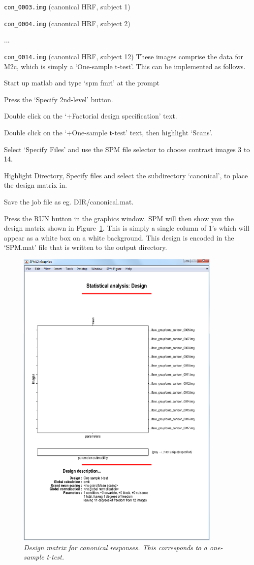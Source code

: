\bi
\item{\verb!con_0003.img!		(canonical HRF, subject 1)}
\item{\verb!con_0004.img!		(canonical HRF, subject 2)}
\item{...}
\item{\verb!con_0014.img!		(canonical HRF, subject 12)}
\ei
These images comprise the data for M2c, which is simply a `One-sample t-test'. This can be implemented as follows.
\bi
\item{Start up matlab and type `spm fmri' at the prompt}
\item{Press the `Specify 2nd-level' button.}
\item{Double click on the `+Factorial design specification' text.}
\item{Double click on the `+One-sample t-test' text, then highlight `Scans'.} 
\item{Select `Specify Files' and use the SPM file selector
to choose contrast images 3 to 14.}
\item{Highlight Directory, Specify files and select the 
subdirectory `canonical', to place the design matrix in.}
\item{Save the job file as eg. {\sf DIR/canonical.mat}}.
\item{Press the RUN button in the graphics window.}
\ei
SPM will then show you the design matrix shown in Figure~\ref{t1}. This is simply a single column of 1's which will appear as a white box on a white background. This design is encoded in the `SPM.mat' file that is written to the output directory.
\begin{figure}
\begin{center}
\includegraphics[width=100mm]{faces_group/t1}
\caption{\em Design matrix for canonical responses. This corresponds to a one-sample t-test. \label{t1}}
\end{center}
\end{figure}
